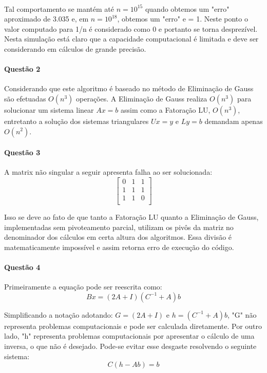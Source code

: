 \documentclass{article}
\begin{document}
            \paragraph{}Tal comportamento se mantém até $n = 10^{15}$ quando obtemos um "erro" aproximado de 3.035 e, em $n = 10^{18}$, obtemos um "erro" e = 1. Neste ponto o valor computado para 1/n é considerado como 0 e portanto se torna desprezível. Nesta simulação está claro que a capacidade computacional é limitada e deve ser considerando em cálculos de grande precisão.

            \paragraph{Questão 2}Considerando que este algoritmo é baseado no método de Eliminação de Gauss são efetuadas $O(n^{3})$ operações. A Eliminação de Gauss realiza $O(n^{3})$ para solucionar um sistema linear $Ax = b$ assim como a Fatoração LU, $O(n^{3})$, entretanto a solução dos sistemas triangulares $Ux=y$ e $Ly=b$ demandam apenas $O(n^{2})$.

            \paragraph{Questão 3}A matrix não singular a seguir apresenta falha ao ser solucionada:
                \[\begin{bmatrix}
                    0 & 1 & 1\\
                    1 & 1 & 1\\
                    1 & 1 & 0\\
                \end{bmatrix}\]
            
            Isso se deve ao fato de que tanto a Fatoração LU quanto a Eliminação de Gauss, implementadas sem pivoteamento parcial, utilizam os pivôs da matriz no denominador dos cálculos em certa altura dos algoritmos. Essa divisão é matematicamente impossível e assim retorna erro de execução do código.

            \paragraph{Questão 4}Primeiramente a equação pode ser reescrita como:
                \[Bx = (2A+I)(C^{-1}+A)b\]

            Simplificando a notação adotando: $G = (2A+I)$ e $h = (C^{-1}+A)b$, "G" não representa problemas computacionais e pode ser calculada diretamente. Por outro lado, "h" representa problemas computacionais por apresentar o cálculo de uma inversa, o que não é desejado. Pode-se evitar esse desgaste resolvendo o seguinte sistema:
                \[C(h-Ab)=b\]
\end{document}

